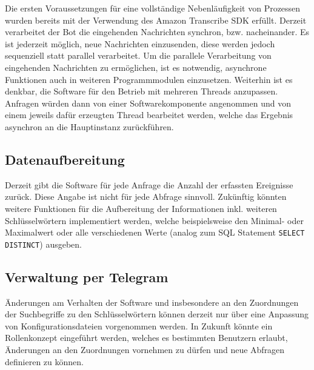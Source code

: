 Die ersten Voraussetzungen für eine vollständige Nebenläufigkeit von Prozessen wurden bereits mit der Verwendung des Amazon Transcribe SDK erfüllt. Derzeit verarbeitet der Bot die eingehenden Nachrichten synchron, bzw. nacheinander. Es ist jederzeit möglich, neue Nachrichten einzusenden, diese werden jedoch sequenziell statt parallel verarbeitet. Um die parallele Verarbeitung von eingehenden Nachrichten zu ermöglichen, ist es notwendig, asynchrone Funktionen auch in weiteren Programmmodulen einzusetzen. Weiterhin ist es denkbar, die Software für den Betrieb mit mehreren Threads anzupassen. Anfragen würden dann von einer Softwarekomponente angenommen und von einem jeweils dafür erzeugten Thread bearbeitet werden, welche das Ergebnis asynchron an die Hauptinstanz zurückführen. 

\subsection{Datenaufbereitung}

Derzeit gibt die Software für jede Anfrage die Anzahl der erfassten Ereignisse zurück. Diese Angabe ist nicht für jede Abfrage sinnvoll. Zukünftig könnten weitere Funktionen für die Aufbereitung der Informationen inkl. weiteren Schlüsselwörtern implementiert werden, welche beispielsweise den Minimal- oder Maximalwert oder alle verschiedenen Werte (analog zum SQL Statement \lstinline{SELECT DISTINCT}) ausgeben.

\subsection{Verwaltung per Telegram}

Änderungen am Verhalten der Software und insbesondere an den Zuordnungen der Suchbegriffe zu den Schlüsselwörtern können derzeit nur über eine Anpassung von Konfigurationsdateien vorgenommen werden. In Zukunft könnte ein Rollenkonzept eingeführt werden, welches es bestimmten Benutzern erlaubt, Änderungen an den Zuordnungen vornehmen zu dürfen und neue Abfragen definieren zu können.
